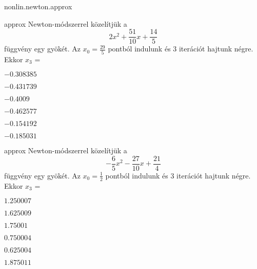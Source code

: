 \documentclass[12pt]{article}
\begin{document}
\begin{quiz}{nonlin.newton.approx}
\begin{multi}{approx}
Newton-módszerrel közelítjük a
$$2x^2+\frac{51}{10}x+\frac{14}{5}$$
függvény egy gyökét. Az $x_{0}=\frac{29}{5}$ pontból indulunk és $3$ iterációt hajtunk 
négre. Ekkor $x_{3}$ =
\item* $-0.308385$
\item  $-0.431739$
\item  $-0.4009$
\item  $-0.462577$
\item  $-0.154192$
\item  $-0.185031$
\end{multi}


\begin{multi}{approx}
Newton-módszerrel közelítjük a
$$-\frac{6}{5}x^2-\frac{27}{10}x+\frac{21}{4}$$
függvény egy gyökét. Az $x_{0}=\frac{1}{2}$ pontból indulunk és $3$ iterációt hajtunk 
négre. Ekkor $x_{3}$ =
\item* $1.250007$
\item  $1.625009$
\item  $1.75001$
\item  $0.750004$
\item  $0.625004$
\item  $1.875011$
\end{multi}\end{quiz}
\end{document}
